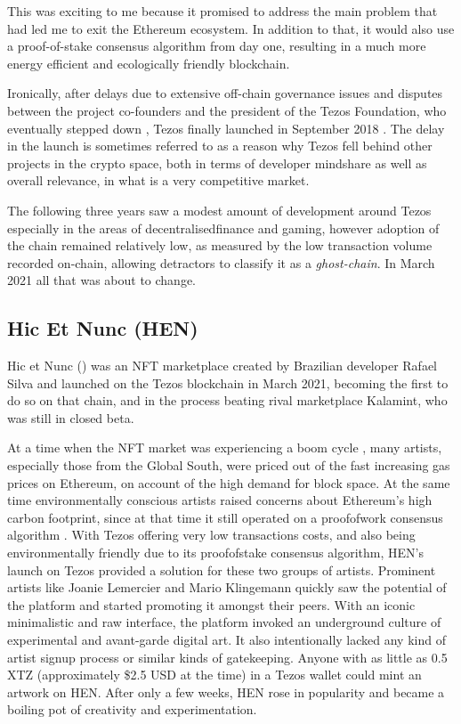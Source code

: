 This was exciting to me because it promised to address the main problem that had led me to exit the Ethereum ecosystem. In addition to that, it would also use a proof-of-stake consensus algorithm from day one, resulting in a much more energy efficient and ecologically friendly blockchain.


Ironically, after delays due to extensive \gls{off-chain} governance issues and disputes between the project co-founders and the president of the Tezos Foundation, who eventually stepped down \cite{irreraExclusiveTezosFounders2017}, Tezos finally launched in September 2018 \cite{daleBillionTezosBlockchain2018}. The delay in the launch is sometimes referred to as a reason why Tezos fell behind other projects in the crypto space, both in terms of developer mindshare as well as overall relevance, in what is a very competitive market.

The following three years saw a modest amount of development around Tezos especially in the areas of \gls{decentralisedfinance} and gaming, however adoption of the chain remained relatively low, as measured by the low transaction volume recorded on-chain, allowing detractors to classify it as a \emph{\gls{ghost-chain}}. In March 2021 all that was about to change.


\subsection*{Hic Et Nunc (HEN)}


Hic et Nunc () was an NFT marketplace created by Brazilian developer Rafael Silva and launched on the Tezos blockchain in March 2021, becoming the first to do so on that chain, and in the process beating rival marketplace Kalamint, who was still in closed beta.

At a time when the NFT market was experiencing a boom cycle \needcite , many artists, especially those from the Global South, were priced out of the fast increasing gas prices on Ethereum, on account of the high demand for block space. At the same time environmentally conscious artists raised concerns about Ethereum's high carbon footprint, since at that time it still operated on a \gls{proofofwork} consensus algorithm \cite{lemercierProblemEthereumCryptoArt2021}. With Tezos offering very low transactions costs, and also being environmentally friendly due to its \gls{proofofstake} consensus algorithm, HEN's launch on Tezos provided a solution for these two groups of artists. Prominent artists like Joanie Lemercier and Mario Klingemann quickly saw the potential of the platform and started promoting it amongst their peers. With an iconic minimalistic and raw interface, the platform invoked an underground culture of experimental and avant-garde digital art. It also intentionally lacked any kind of artist signup process or similar kinds of gatekeeping. Anyone with as little as 0.5 XTZ (approximately \$2.5 USD at the time) in a Tezos wallet could mint an artwork on HEN. After only a few weeks, HEN rose in popularity and became a boiling pot of creativity and experimentation.

